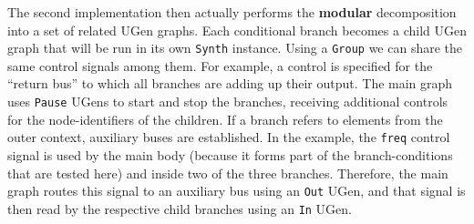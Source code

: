 \documentclass[11pt,a4paper]{article}
\begin{document}
The second implementation then actually performs the \textbf{modular} decomposition into a set of related UGen graphs. Each conditional branch becomes a child UGen graph that will be run in its own \Verb!Synth! instance. Using a \Verb!Group! we can share the same control signals among them. For example, a control is specified for the ``return bus'' to which all branches are adding up their output. The main graph uses \Verb!Pause! UGens to start and stop the branches, receiving additional controls for the node-identifiers of the children. If a branch refers to elements from the outer context, auxiliary buses are established. In the example, the \Verb!freq! control signal is used by the main body (because it forms part of the branch-conditions that are tested here) and inside two of the three branches. Therefore, the main graph routes this signal to an auxiliary bus using an \Verb!Out! UGen, and that signal is then read by the respective child branches using an \Verb!In! UGen.
\end{document}
